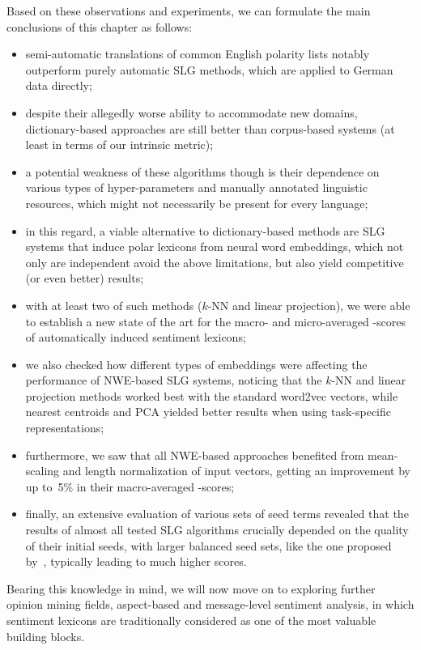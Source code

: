 Based on these observations and experiments, we can formulate the main
conclusions of this chapter as follows:
\begin{itemize}
\item semi-automatic translations of common English polarity lists
  notably outperform purely automatic SLG methods, which are applied
  to German data directly;
\item despite their allegedly worse ability to accommodate new
  domains, dictionary-based approaches are still better than
  corpus-based systems (at least in terms of our intrinsic metric);
\item a potential weakness of these algorithms though is their
  dependence on various types of hyper-parameters and manually
  annotated linguistic resources, which might not necessarily be
  present for every language;
\item in this regard, a viable alternative to dictionary-based methods
  are SLG systems that induce polar lexicons from neural word
  embeddings, which not only are independent avoid the above limitations, but
  also yield competitive (or even better) results;
\item with at least two of such methods ($k$-NN and linear
  projection), we were able to establish a new state of the art for
  the macro- and micro-averaged \F-scores of automatically induced
  sentiment lexicons;
\item we also checked how different types of embeddings were affecting
  the performance of NWE-based SLG systems, noticing that the $k$-NN
  and linear projection methods worked best with the standard word2vec
  vectors, while nearest centroids and PCA yielded better results when
  using task-specific representations;
\item furthermore, we saw that all NWE-based approaches benefited from
  mean-scaling and length normalization of input vectors, getting an
  improvement by up to~5\% in their macro-averaged \F-scores;
\item finally, an extensive evaluation of various sets of seed terms
  revealed that the results of almost all tested SLG algorithms
  crucially depended on the quality of their initial seeds, with
  larger balanced seed sets, \eg{} like the one proposed
  by~\citet{Kim:04}, typically leading to much higher scores.
\end{itemize}

Bearing this knowledge in mind, we will now move on to exploring
further opinion mining fields, aspect-based and message-level
sentiment analysis, in which sentiment lexicons are traditionally
considered as one of the most valuable building blocks.

